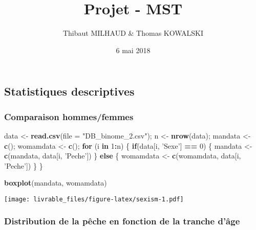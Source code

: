 \documentclass[]{article}
\title{Projet - MST}
\author{Thibaut MILHAUD \& Thomas KOWALSKI}
\date{6 mai 2018}
\newenvironment{Shaded}{\begin{snugshade}}{\end{snugshade}}
\newcommand{\KeywordTok}[1]{\textcolor[rgb]{0.13,0.29,0.53}{\textbf{#1}}}
\newcommand{\DataTypeTok}[1]{\textcolor[rgb]{0.13,0.29,0.53}{#1}}
\newcommand{\DecValTok}[1]{\textcolor[rgb]{0.00,0.00,0.81}{#1}}
\newcommand{\StringTok}[1]{\textcolor[rgb]{0.31,0.60,0.02}{#1}}
\newcommand{\ControlFlowTok}[1]{\textcolor[rgb]{0.13,0.29,0.53}{\textbf{#1}}}
\newcommand{\OperatorTok}[1]{\textcolor[rgb]{0.81,0.36,0.00}{\textbf{#1}}}
\newcommand{\NormalTok}[1]{#1}
\begin{document}
\maketitle

\subsection{Statistiques descriptives}\label{statistiques-descriptives}

\subsubsection{Comparaison
hommes/femmes}\label{comparaison-hommesfemmes}

\begin{Shaded}
\begin{Highlighting}[]
\NormalTok{data <-}\StringTok{ }\KeywordTok{read.csv}\NormalTok{(}\DataTypeTok{file =} \StringTok{"DB_binome_2.csv"}\NormalTok{);}
\NormalTok{n <-}\StringTok{ }\KeywordTok{nrow}\NormalTok{(data);}
\NormalTok{mandata <-}\StringTok{ }\KeywordTok{c}\NormalTok{();}
\NormalTok{womamdata <-}\StringTok{ }\KeywordTok{c}\NormalTok{();}
\ControlFlowTok{for}\NormalTok{ (i }\ControlFlowTok{in} \DecValTok{1}\OperatorTok{:}\NormalTok{n)}
\NormalTok{\{}
  \ControlFlowTok{if}\NormalTok{(data[i, }\StringTok{'Sexe'}\NormalTok{] }\OperatorTok{==}\StringTok{ }\DecValTok{0}\NormalTok{)}
\NormalTok{  \{}
\NormalTok{    mandata <-}\StringTok{ }\KeywordTok{c}\NormalTok{(mandata, data[i, }\StringTok{'Peche'}\NormalTok{])}
\NormalTok{  \}}
  \ControlFlowTok{else}
\NormalTok{  \{}
\NormalTok{    womamdata <-}\StringTok{ }\KeywordTok{c}\NormalTok{(womamdata, data[i, }\StringTok{'Peche'}\NormalTok{])}
\NormalTok{  \}}
\NormalTok{\}}

\KeywordTok{boxplot}\NormalTok{(mandata, womamdata)}
\end{Highlighting}
\end{Shaded}

\texttt{[image: livrable\_files/figure-latex/sexism-1.pdf]}

\subsubsection{Distribution de la pêche en fonction de la tranche
d'âge}\label{distribution-de-la-peche-en-fonction-de-la-tranche-dage}
\end{document}
